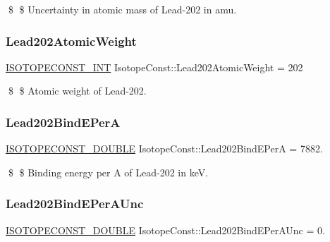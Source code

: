 \$ \$ Uncertainty in atomic mass of Lead-\/202 in amu. \mbox{\label{group___isotope_const-_lead-_pb202_gafc7addef86160784e8920d599b20b4fc}} 
\subsubsection{\texorpdfstring{Lead202\+Atomic\+Weight}{Lead202AtomicWeight}}
{\footnotesize\ttfamily \mbox{\hyperlink{group___isotope_const-_macros_ga5f18360b3e99483a35c32d789e62621c}{I\+S\+O\+T\+O\+P\+E\+C\+O\+N\+S\+T\+\_\+\+I\+NT}} Isotope\+Const\+::\+Lead202\+Atomic\+Weight = 202}

\$ \$ Atomic weight of Lead-\/202. \mbox{\label{group___isotope_const-_lead-_pb202_ga4e20cbcd8cb25ad21de94f261388e822}} 
\subsubsection{\texorpdfstring{Lead202\+Bind\+E\+PerA}{Lead202BindEPerA}}
{\footnotesize\ttfamily \mbox{\hyperlink{group___isotope_const-_macros_ga8f45a7272ce02c0b4c65c44636ed719a}{I\+S\+O\+T\+O\+P\+E\+C\+O\+N\+S\+T\+\_\+\+D\+O\+U\+B\+LE}} Isotope\+Const\+::\+Lead202\+Bind\+E\+PerA = 7882.}

\$ \$ Binding energy per A of Lead-\/202 in keV. \mbox{\label{group___isotope_const-_lead-_pb202_ga55c86967130d30856a77d56b5870d808}} 
\subsubsection{\texorpdfstring{Lead202\+Bind\+E\+Per\+A\+Unc}{Lead202BindEPerAUnc}}
{\footnotesize\ttfamily \mbox{\hyperlink{group___isotope_const-_macros_ga8f45a7272ce02c0b4c65c44636ed719a}{I\+S\+O\+T\+O\+P\+E\+C\+O\+N\+S\+T\+\_\+\+D\+O\+U\+B\+LE}} Isotope\+Const\+::\+Lead202\+Bind\+E\+Per\+A\+Unc = 0.}

